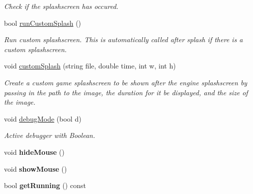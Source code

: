 \begin{DoxyCompactItemize}
\begin{DoxyCompactList}\small\item\em Check if the splashscreen has occured. \end{DoxyCompactList}\item 
bool \hyperlink{classEngine_a5c87c90c9dd6b3fd652e24af0c7e935d}{run\+Custom\+Splash} ()\hypertarget{classEngine_a5c87c90c9dd6b3fd652e24af0c7e935d}{}\label{classEngine_a5c87c90c9dd6b3fd652e24af0c7e935d}

\begin{DoxyCompactList}\small\item\em Run custom splashscreen. This is automatically called after splash if there is a custom splashscreen. \end{DoxyCompactList}\item 
void \hyperlink{classEngine_a0960e415d0b9ed92099eee6677d7ea51}{custom\+Splash} (string file, double time, int w, int h)\hypertarget{classEngine_a0960e415d0b9ed92099eee6677d7ea51}{}\label{classEngine_a0960e415d0b9ed92099eee6677d7ea51}

\begin{DoxyCompactList}\small\item\em Create a custom game splashscreen to be shown after the engine splashscreen by passing in the path to the image, the duration for it be displayed, and the size of the image. \end{DoxyCompactList}\item 
void \hyperlink{classEngine_a60d5307c4bc5005119086ff9f3e21624}{debug\+Mode} (bool d)\hypertarget{classEngine_a60d5307c4bc5005119086ff9f3e21624}{}\label{classEngine_a60d5307c4bc5005119086ff9f3e21624}

\begin{DoxyCompactList}\small\item\em Active debugger with Boolean. \end{DoxyCompactList}\item 
void {\bfseries hide\+Mouse} ()\hypertarget{classEngine_ab28645d6809f5335cc9034caaba38827}{}\label{classEngine_ab28645d6809f5335cc9034caaba38827}

\item 
void {\bfseries show\+Mouse} ()\hypertarget{classEngine_a6d476e93e46e59543ea9714b93a30936}{}\label{classEngine_a6d476e93e46e59543ea9714b93a30936}

\item 
bool {\bfseries get\+Running} () const \hypertarget{classEngine_a8261a8bc23adeaf5a17a1d6301223eda}{}\label{classEngine_a8261a8bc23adeaf5a17a1d6301223eda}


\end{DoxyCompactItemize}
